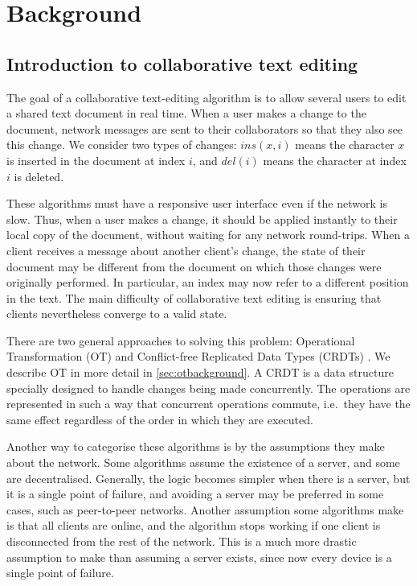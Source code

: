\documentclass[sigplan,10pt,review,anonymous]{acmart}
\begin{document}
\section{Background} \label{sec:background}

\subsection{Introduction to collaborative text editing}

The goal of a collaborative text-editing algorithm is to allow several users to edit a shared text document in real time. When a user makes a change to the
document, network messages are sent to their collaborators so that they also see this change. We consider two types of changes: $\mathit{ins}(x, i)$ means the character $x$ is inserted in the document at index $i$, and $\mathit{del}(i)$ means the character at index $i$ is deleted.

These algorithms must have a responsive user interface even if the network is slow. Thus, when a user makes a change, it should be applied instantly to their local copy of the document, without waiting for any network round-trips. When a client receives a message about another client's change, the state of their document may be different from the document on which those changes were originally performed.
In particular, an index may now refer to a different position in the text.
The main difficulty of collaborative text editing is ensuring that clients nevertheless converge to a valid state.

There are two general approaches to solving this problem: Operational Transformation (OT) \cite{Ellis1989} and Conflict-free Replicated Data Types (CRDTs) \cite{Preguica2009}. We describe OT in more detail in \autoref{sec:otbackground}. A CRDT is a data structure specially designed to handle changes being made concurrently. The operations are represented in such a way that concurrent operations commute, i.e.\ they have the same effect regardless of the order in which they are executed.

Another way to categorise these algorithms is by the assumptions they make about the network. Some algorithms assume the existence of a server, and some are decentralised. Generally, the logic becomes simpler when there is a server, but it is a single point of failure, and avoiding a server may be preferred in some cases, such as peer-to-peer networks. Another assumption some algorithms make is that all clients are online, and the algorithm stops working if one client is disconnected from the rest of the network. This is a much more drastic assumption to make than assuming a server exists, since now every device is a single point of failure. 
\end{document}
